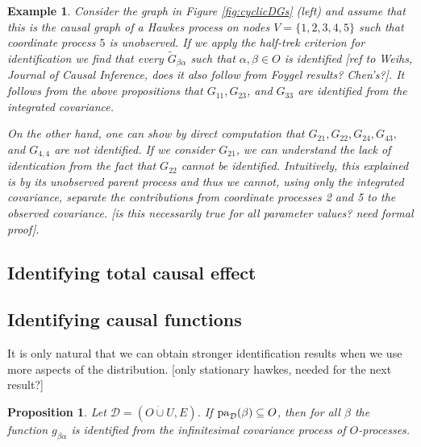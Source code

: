 \documentclass[accepted]{uai2021} %
\newtheorem{exmp}[thm]{Example}
\newtheorem{prop}[thm]{Proposition}
\newcommand{\pa}{\textnormal{pa}}
\newcommand{\disjU}{\mathbin{\dot{\cup}}}
\begin{document}
\begin{exmp}
	Consider the graph in Figure \ref{fig:cyclicDGs} (left) and assume that 
	this is the causal graph of a Hawkes process on nodes $V = \{1,2,3,4,5\}$ 
	such that coordinate process $5$ is unobserved. If we apply the half-trek 
	criterion for identification we find that every $\tilde{G}_{\beta\alpha}$ 
	such that 
	$\alpha,\beta\in O$ is identified [ref to Weihs, Journal of Causal 
	Inference, does it also follow from Foygel results? Chen's?]. It follows 
	from the 
	above propositions that $G_{11}, G_{23}$, and $G_{33}$ are identified from 
	the integrated covariance.
	
	On the other hand, one can show by direct computation that $G_{21}, G_{22}, 
	G_{24}, 
	G_{43},$ and $G_{4,4}$ are not identified. If we consider $G_{21}$, we can 
	understand the lack of identication from the fact that $G_{22}$ 
	cannot 
	be identified. 
	Intuitively, this explained is by its unobserved parent process and thus we 
	cannot, using only the integrated covariance, separate the contributions 
	from coordinate processes 2 and 5 to the observed covariance. [is this 
	necessarily true for all parameter 
	values? need formal proof]. 
\end{exmp}


\subsection{Identifying total causal effect}




\subsection{Identifying causal functions}

It is only natural that we can obtain stronger identification results when we 
use more aspects of the distribution. [only stationary hawkes, needed for the 
next result?]

\begin{prop}
	Let $\mathcal{D} = (O\disjU U, E)$. If $\pa_\mathcal{D}(\beta) \subseteq 
	O$, then for all $\beta$ the function $g_{\beta\alpha}$ is identified from 
	the infinitesimal covariance process of $O$-processes.
	\label{prop:gPaId}
\end{prop}
\end{document}
